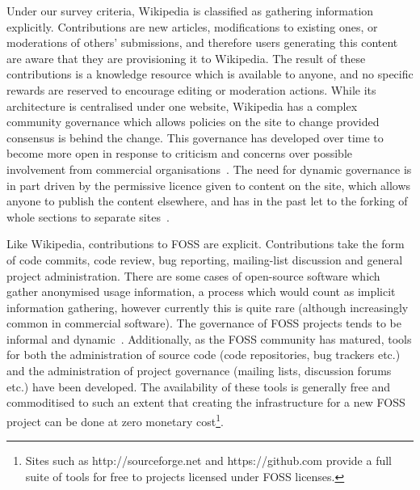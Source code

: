 Under our survey criteria, Wikipedia is classified as gathering information explicitly. Contributions are new articles, modifications to existing ones, or moderations of others' submissions, and therefore users generating this content are aware that they are provisioning it to Wikipedia. The result of these contributions is a knowledge resource which is available to anyone, and no specific rewards are reserved to encourage editing or moderation actions. While its architecture is centralised under one website, Wikipedia has a complex community governance which allows policies on the site to change provided consensus is behind the change. This governance has developed over time to become more open in response to criticism and concerns over possible involvement from commercial organisations~\citep{MayoFusterMorell2011}. The need for dynamic governance is in part driven by the permissive licence given to content on the site, which allows anyone to publish the content elsewhere, and has in the past let to the forking of whole sections to separate sites~\citep{Famiglietti2011}.

Like Wikipedia, contributions to FOSS are explicit. Contributions take the form of code commits, code review, bug reporting, mailing-list discussion and general project administration. 
There are some cases of open-source software which gather anonymised usage information, a process which would count as implicit information gathering, however currently this is quite rare (although increasingly common in commercial software). 
The governance of FOSS projects tends to be informal and dynamic~\citep{Schweik2007}. 
Additionally, as the FOSS community has matured, tools for both the administration of source code (code repositories, bug trackers etc.) and the administration of project governance (mailing lists, discussion forums etc.) have been developed. 
The availability of these tools is generally free and commoditised to such an extent that creating the infrastructure for a new FOSS project can be done at zero monetary cost\footnote{Sites such as http://sourceforge.net and https://github.com provide a full suite of tools for free to projects licensed under FOSS licenses.}.

